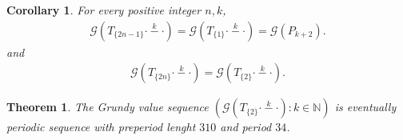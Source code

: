 \documentclass[12pt]{elsarticle}
\newtheorem{theorem}{Theorem}[section]
\newtheorem*{theorem A}{Theorem A}
\newtheorem*{theorem B}{N\"olker's Theorem}
\newtheorem{corollary}{Corollary}[section]
\theoremstyle{remark}
\theoremstyle{remark}
\theoremstyle{definition}
\begin{document}
\begin{corollary}
	For every positive integer $n,k$,
	\begin{align*}
		\mathcal{G}\left(T_{\{2n-1\}} \stackrel{k}{\cdot - \cdot}\right) = \mathcal{G}\left(T_{\{1\}} \stackrel{k}{\cdot - \cdot}\right) = \mathcal{G}\left(P_{k+2} \right).
	\end{align*}
	and
	\begin{align*}
		\mathcal{G}\left(T_{\{2n\}} \stackrel{k}{\cdot - \cdot}\right) = \mathcal{G}\left(T_{\{2\}} \stackrel{k}{\cdot - \cdot}\right).
	\end{align*}
\end{corollary}

\begin{theorem}\label{thm:t2k}
	The Grundy value sequence $\left(\mathcal{G}\left(T_{\{2\}} \stackrel{k}{\cdot - \cdot}\right) : k \in \mathbb{N}\right)$ is eventually periodic sequence with preperiod lenght $310$ and period $34$.
\end{theorem}
\end{document}
